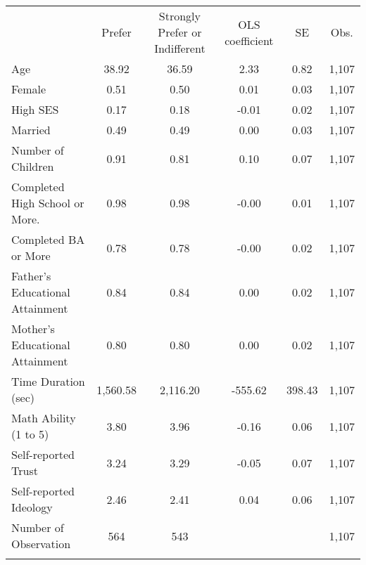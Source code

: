 \documentclass[]{article}
\begin{document}
\begin{adjustbox}{width=\columnwidth,center}
\begin{tabular}{lccccc}
\hline \noalign{\smallskip} & Prefer & Strongly Prefer or Indifferent & OLS coefficient & SE & Obs.\\
\noalign{\smallskip}\hline \noalign{\smallskip}Age & 38.92 & 36.59 & 2.33 & 0.82 & 1,107\\
Female & 0.51 & 0.50 & 0.01 & 0.03 & 1,107\\
High SES & 0.17 & 0.18 & -0.01 & 0.02 & 1,107\\
Married & 0.49 & 0.49 & 0.00 & 0.03 & 1,107\\
Number of Children & 0.91 & 0.81 & 0.10 & 0.07 & 1,107\\
Completed High School or More. & 0.98 & 0.98 & -0.00 & 0.01 & 1,107\\
Completed BA or More & 0.78 & 0.78 & -0.00 & 0.02 & 1,107\\
Father's Educational Attainment & 0.84 & 0.84 & 0.00 & 0.02 & 1,107\\
Mother's Educational Attainment & 0.80 & 0.80 & 0.00 & 0.02 & 1,107\\
Time Duration (sec) & 1,560.58 & 2,116.20 & -555.62 & 398.43 & 1,107\\
Math Ability (1 to 5) & 3.80 & 3.96 & -0.16 & 0.06 & 1,107\\
Self-reported Trust & 3.24 & 3.29 & -0.05 & 0.07 & 1,107\\
Self-reported Ideology & 2.46 & 2.41 & 0.04 & 0.06 & 1,107\\
\hline Number of Observation & 564 & 543 &  &  & 1,107 \\
\noalign{\smallskip}\hline
\end{tabular}\\
\end{adjustbox}
\end{document}
